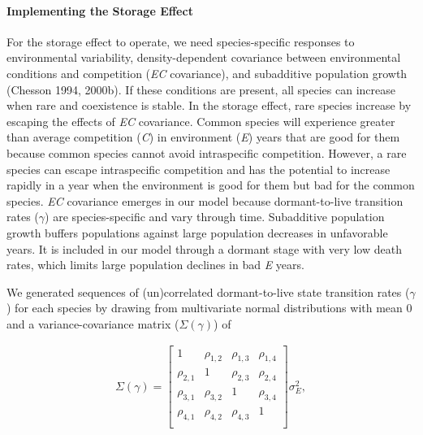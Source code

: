 \documentclass[12pt,]{article}
\let\oldparagraph\paragraph
\renewcommand{\paragraph}[1]{\oldparagraph{#1}\mbox{}}
\begin{document}
\paragraph{Implementing the Storage
Effect}\label{implementing-the-storage-effect}

For the storage effect to operate, we need species-specific responses to
environmental variability, density-dependent covariance between
environmental conditions and competition (\emph{EC} covariance), and
subadditive population growth (Chesson 1994, 2000b). If these conditions
are present, all species can increase when rare and coexistence is
stable. In the storage effect, rare species increase by escaping the
effects of \emph{EC} covariance. Common species will experience greater
than average competition (\emph{C}) in environment (\emph{E}) years that
are good for them because common species cannot avoid intraspecific
competition. However, a rare species can escape intraspecific
competition and has the potential to increase rapidly in a year when the
environment is good for them but bad for the common species. \emph{EC}
covariance emerges in our model because dormant-to-live transition rates
(\(\gamma\)) are species-specific and vary through time.
Subadditive population growth buffers populations against large
population decreases in unfavorable years. It is included in our model
through a dormant stage with very low death rates, which limits large
population declines in bad \emph{E} years.

We generated sequences of (un)correlated dormant-to-live state
transition rates (\(\gamma\)) for each species by drawing from
multivariate normal distributions with mean 0 and a variance-covariance
matrix (\(\Sigma(\gamma)\)) of \vspace{-3em}

\begin{align}
\Sigma(\gamma) = 
\begin{bmatrix}
1 & \rho_{1,2} & \rho_{1,3} & \rho_{1,4} \\
\rho_{2,1} & 1 & \rho_{2,3} & \rho_{2,4} \\
\rho_{3,1} & \rho_{3,2} & 1  & \rho_{3,4} \\
\rho_{4,1} & \rho_{4,2} & \rho_{4,3} & 1  \\
\end{bmatrix}
\sigma_{E}^2,
\end{align}\vspace{-2em}
\end{document}
